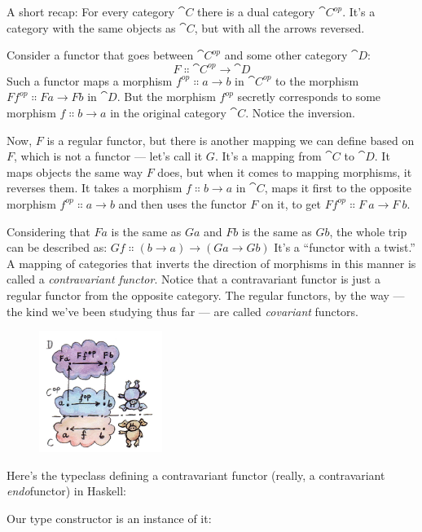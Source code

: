 A short recap: For every category $\cat{C}$ there is a dual category
$\cat{C}^{op}$. It's a category with the same objects as
$\cat{C}$, but with all the arrows reversed.

Consider a functor that goes between $\cat{C}^{op}$ and
some other category $\cat{D}$:
\[F \Colon \cat{C}^{op} \to \cat{D}\]
Such a functor maps a morphism $f^{op} \Colon a \to b$ in
$\cat{C}^{op}$ to the morphism $F f^{op} \Colon F a \to F b$ in $\cat{D}$. But the morphism
$f^{op}$ secretly corresponds to some morphism
$f \Colon b \to a$ in the original category $\cat{C}$. Notice the
inversion.

Now, $F$ is a regular functor, but there is another mapping we can
define based on $F$, which is not a functor --- let's call it
$G$. It's a mapping from $\cat{C}$ to $\cat{D}$. It maps objects the
same way $F$ does, but when it comes to mapping morphisms, it
reverses them. It takes a morphism $f \Colon b \to a$ in $\cat{C}$, maps
it first to the opposite morphism $f^{op} \Colon a \to b$
and then uses the functor $F$ on it, to get $F f^{op} \Colon F\ a \to F\ b$.

Considering that $F a$ is the same as $G a$ and $F b$ is
the same as $G b$, the whole trip can be described as: $G f \Colon (b \to a) \to (G a \to G b)$
It's a ``functor with a twist.'' A mapping of categories that inverts
the direction of morphisms in this manner is called a
\emph{contravariant functor}. Notice that a contravariant functor is
just a regular functor from the opposite category. The regular functors,
by the way --- the kind we've been studying thus far --- are called
\emph{covariant} functors.

\begin{figure}[H]
\centering
\includegraphics[width=40mm]{images/contravariant.jpg}
\end{figure}

\noindent
Here's the typeclass defining a contravariant functor (really, a
contravariant \emph{endo}functor) in Haskell:

Our type constructor  is an instance of it:

